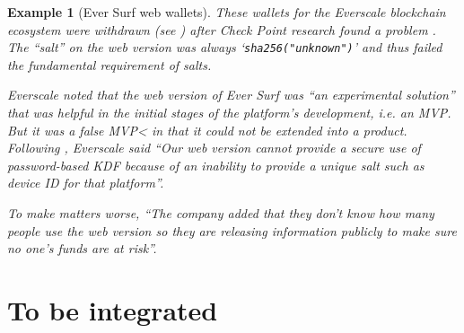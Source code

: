 \documentclass{article}
\newtheorem{example}{Example}
\begin{document}
\begin{example}[Ever Surf web wallets]\rm
These wallets for the Everscale blockchain ecosystem were withdrawn (see \cite{Greig2022r}) after Check Point research found a problem \cite{CheckPoint2022d}.  The ``salt'' on the web version was always `\verb+sha256("unknown")+' and thus failed the fundamental requirement of salts.
\par
Everscale noted that the web version of Ever Surf was ``an experimental solution'' that was helpful in the initial stages of the platform’s development, i.e. an MVP. But it was a false MVP< in that it could not be extended into a product. Following \cite{CheckPoint2022d}, Everscale said ``Our web version cannot provide a secure use of password-based KDF because of an inability to provide a unique salt such as device ID for that platform''.
\par
To make matters worse, ``The company added that they don't know how many people use the web version so they are releasing information publicly to make sure no one's funds are at risk''.
\end{example}
\section{To be integrated}
\cite{Hughes2021v,CISQ2021a,NIST2016d}
\cite{Woodcocketal2010a}

\end{document}
